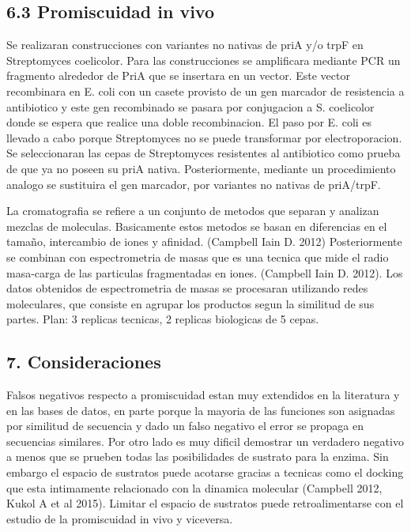 \documentclass[12pt,twoside]{reedthesis}
\begin{document}
  \subsection{6.3 Promiscuidad in vivo}\label{promiscuidad-in-vivo}
  
  Se realizaran construcciones con variantes no nativas de priA y/o trpF
  en Streptomyces coelicolor. Para las construcciones se amplificara
  mediante PCR un fragmento alrededor de PriA que se insertara en un
  vector. Este vector recombinara en E. coli con un casete provisto de un
  gen marcador de resistencia a antibiotico y este gen recombinado se
  pasara por conjugacion a S. coelicolor donde se espera que realice una
  doble recombinacion. El paso por E. coli es llevado a cabo porque
  Streptomyces no se puede transformar por electroporacion. Se
  seleccionaran las cepas de Streptomyces resistentes al antibiotico como
  prueba de que ya no poseen su priA nativa. Posteriormente, mediante un
  procedimiento analogo se sustituira el gen marcador, por variantes no
  nativas de priA/trpF.
  
  La cromatografia se refiere a un conjunto de metodos que separan y
  analizan mezclas de moleculas. Basicamente estos metodos se basan en
  diferencias en el tamaño, intercambio de iones y afinidad. (Campbell
  Iain D. 2012) Posteriormente se combinan con espectrometria de masas que
  es una tecnica que mide el radio masa-carga de las particulas
  fragmentadas en iones. (Campbell Iain D. 2012). Los datos obtenidos de
  espectrometria de masas se procesaran utilizando redes moleculares, que
  consiste en agrupar los productos segun la similitud de sus partes.
  Plan: 3 replicas tecnicas, 2 replicas biologicas de 5 cepas.
  
  \subsection{7. Consideraciones}\label{consideraciones}
  
  Falsos negativos respecto a promiscuidad estan muy extendidos en la
  literatura y en las bases de datos, en parte porque la mayoria de las
  funciones son asignadas por similitud de secuencia y dado un falso
  negativo el error se propaga en secuencias similares. Por otro lado es
  muy dificil demostrar un verdadero negativo a menos que se prueben todas
  las posibilidades de sustrato para la enzima. Sin embargo el espacio de
  sustratos puede acotarse gracias a tecnicas como el docking que esta
  intimamente relacionado con la dinamica molecular (Campbell 2012, Kukol
  A et al 2015). Limitar el espacio de sustratos puede retroalimentarse
  con el estudio de la promiscuidad in vivo y viceversa.
  
\end{document}
